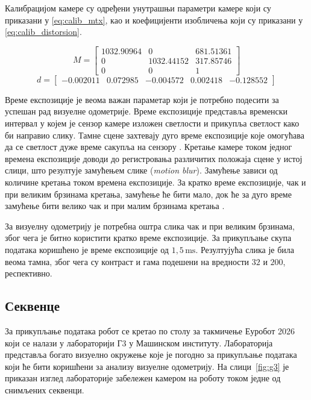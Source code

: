 \documentclass[12pt]{article}
\begin{document}
Калибрацијом камере су одређени унутрашњи параметри камере који су приказани у
\eqref{eq:calib_mtx}, као и коефицијенти изобличења који су приказани у
\eqref{eq:calib_distorsion}.

\begin{equation}
	M = \begin{bmatrix} 1032.90964 & 0 & 681.51361 \\ 0 & 1032.44152 & 317.85746\\ 0 & 0 & 1
	\end{bmatrix}
	\label{eq:calib_mtx}
\end{equation}
\begin{equation}
	d = \begin{bmatrix} -0.002011 & 0.072985 & -0.004572 & 0.002418 & -0.128552 \end{bmatrix}
	\label{eq:calib_distorsion}
\end{equation}

Време експозиције је веома важан параметар који је потребно подесити за успешан
рад визуелне одометрије. Време експозиције представља временски интервал у
којем је сензор камере изложен светлости и прикупља светлост како би направио
слику. Тамне сцене захтевају дуго време експозиције које омогућава да се
светлост дуже време сакупља на сензору \cite{vanderhorst2022shutter}. Кретање
камере током једног времена експозиције доводи до регистровања различитих
положаја сцене у истој слици, што резултује замућењем слике (\textit{motion
	blur}). Замућење зависи од количине кретања током времена експозиције. За
кратко време експозиције, чак и при великим брзинама кретања, замућење ће бити
мало, док ће за дуго време замућење бити велико чак и при малим брзинама
кретања \cite{liu2021mbavo}.

За визуелну одометрију је потребна оштра слика чак и при великим брзинама, због
чега је битно користити кратко време експозиције. За прикупљање скупа података
коришћено је време експозиције од $1{,}5\,\mathrm{ms}$. Резултујућа слика је
била веома тамна, због чега су контраст и гама подешени на вредности $32$ и
$200$, респективно.

\subsection{Секвенце}
За прикупљање података робот се кретао по столу за такмичење Еуробот 2026 који
се налази у лабораторији Г3 у Машинском институту. Лабораторија представља
богато визуелно окружење које је погодно за прикупљање података који ће бити
коришћени за анализу визуелне одометрију. На слици~\ref{fig:g3} је приказан
изглед лабораторије забележен камером на роботу током једне од снимљених
секвенци.
\end{document}
